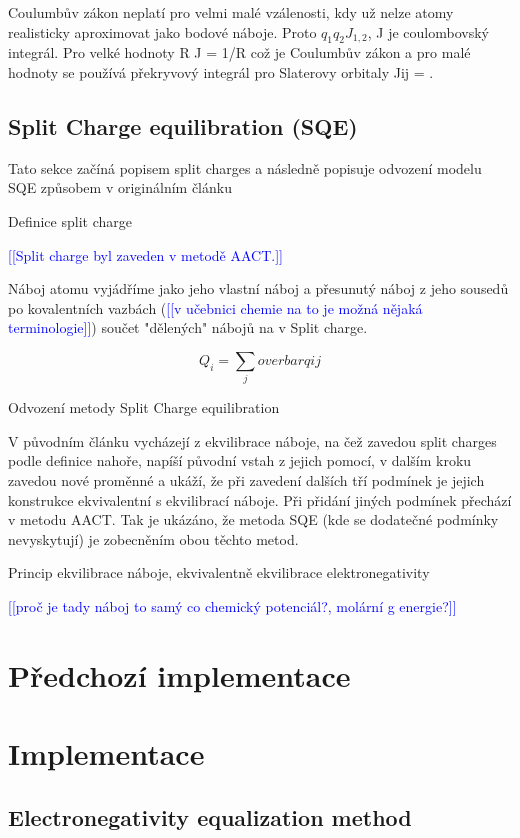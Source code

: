 \documentclass[10pt,draft,oneside]{fithesis2}
\newcommand\todo[1]{\textcolor{blue}{[[#1]]}}
\begin{document}
Coulumbův zákon neplatí pro velmi malé vzálenosti, kdy už nelze atomy realisticky aproximovat jako bodové náboje. Proto  $q_1 q_2 J_{1,2}$, J je coulombovský integrál. Pro velké hodnoty R J = 1/R což je Coulumbův zákon a pro malé hodnoty se používá překryvový integrál pro Slaterovy orbitaly Jij = .



\section{Split Charge equilibration (SQE)}

Tato sekce začíná popisem split charges a následně popisuje odvození modelu SQE způsobem v originálním článku

Definice split charge

\todo{Split charge byl zaveden v metodě AACT.}

Náboj atomu vyjádříme jako jeho vlastní náboj a přesunutý náboj z jeho sousedů po kovalentních vazbách (\todo{v učebnici chemie na to je možná nějaká terminologie}) součet "dělených" nábojů na v Split charge.

\[Q_i = \sum_j overbar qij\]

Odvození metody Split Charge equilibration

V původním článku vycházejí z ekvilibrace náboje, na čež zavedou split charges podle definice nahoře, napíší původní vstah z jejich pomocí, v dalším kroku zavedou nové proměnné a ukáží, že při zavedení dalších tří podmínek je jejich konstrukce ekvivalentní s ekvilibrací náboje. Při přidání jiných podmínek přechází v metodu AACT. Tak je ukázáno, že metoda SQE (kde se dodatečné podmínky nevyskytují) je zobecněním obou těchto metod.

Princip ekvilibrace náboje, ekvivalentně ekvilibrace elektronegativity

\todo{proč je tady náboj to samý co chemický potenciál?, molární g energie?}

\chapter{Předchozí implementace}

\chapter{Implementace}

\section{Electronegativity equalization method}
\end{document}
